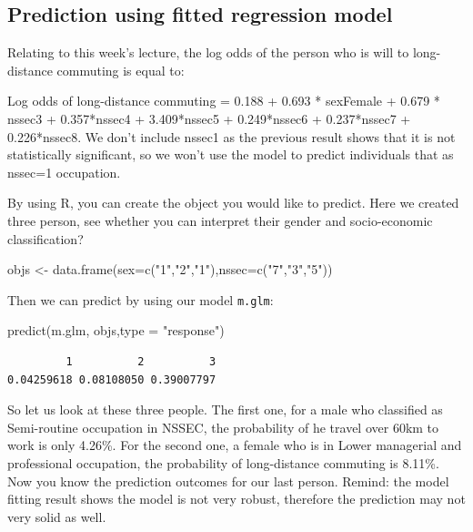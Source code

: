 \documentclass[
  letterpaper,
  DIV=11,
  numbers=noendperiod]{scrreprt}
\newenvironment{Shaded}{\begin{snugshade}}{\end{snugshade}}
\newcommand{\AttributeTok}[1]{\textcolor[rgb]{0.40,0.45,0.13}{#1}}
\newcommand{\FunctionTok}[1]{\textcolor[rgb]{0.28,0.35,0.67}{#1}}
\newcommand{\NormalTok}[1]{\textcolor[rgb]{0.00,0.23,0.31}{#1}}
\newcommand{\OtherTok}[1]{\textcolor[rgb]{0.00,0.23,0.31}{#1}}
\newcommand{\StringTok}[1]{\textcolor[rgb]{0.13,0.47,0.30}{#1}}
\begin{document}
\subsection{Prediction using fitted regression
model}\label{prediction-using-fitted-regression-model}

Relating to this week's lecture, the log odds of the person who is will
to long-distance commuting is equal to:

Log odds of long-distance commuting = 0.188 + 0.693 * sexFemale + 0.679
* nssec3 + 0.357*nssec4 + 3.409*nssec5 + 0.249*nssec6 + 0.237*nssec7 +
0.226*nssec8. We don't include nssec1 as the previous result shows that
it is not statistically significant, so we won't use the model to
predict individuals that as nssec=1 occupation.

By using R, you can create the object you would like to predict. Here we
created three person, see whether you can interpret their gender and
socio-economic classification?

\begin{Shaded}
\begin{Highlighting}[]
\NormalTok{objs }\OtherTok{\textless{}{-}} \FunctionTok{data.frame}\NormalTok{(}\AttributeTok{sex=}\FunctionTok{c}\NormalTok{(}\StringTok{"1"}\NormalTok{,}\StringTok{"2"}\NormalTok{,}\StringTok{"1"}\NormalTok{),}\AttributeTok{nssec=}\FunctionTok{c}\NormalTok{(}\StringTok{"7"}\NormalTok{,}\StringTok{"3"}\NormalTok{,}\StringTok{"5"}\NormalTok{))}
\end{Highlighting}
\end{Shaded}

Then we can predict by using our model \texttt{m.glm}:

\begin{Shaded}
\begin{Highlighting}[]
\FunctionTok{predict}\NormalTok{(m.glm, objs,}\AttributeTok{type =} \StringTok{"response"}\NormalTok{)}
\end{Highlighting}
\end{Shaded}

\begin{verbatim}
         1          2          3 
0.04259618 0.08108050 0.39007797 
\end{verbatim}

So let us look at these three people. The first one, for a male who
classified as Semi-routine occupation in NSSEC, the probability of he
travel over 60km to work is only 4.26\%. For the second one, a female
who is in Lower managerial and professional occupation, the probability
of long-distance commuting is 8.11\%. Now you know the prediction
outcomes for our last person. Remind: the model fitting result shows the
model is not very robust, therefore the prediction may not very solid as
well.
\end{document}

